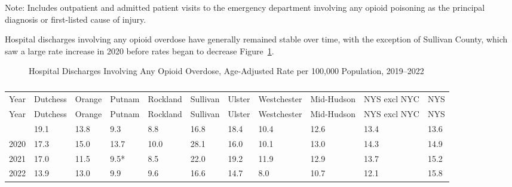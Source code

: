 \documentclass[
  english,
  letterpaper,
]{report}
\begin{document}
\begin{tcolorbox}[enhanced jigsaw, breakable, leftrule=.75mm, title=\textcolor{quarto-callout-note-color}{\faInfo}\hspace{0.5em}{Note}, bottomrule=.15mm, opacityback=0, left=2mm, colback=white, bottomtitle=1mm, coltitle=black, colbacktitle=quarto-callout-note-color!10!white, colframe=quarto-callout-note-color-frame, opacitybacktitle=0.6, toptitle=1mm, titlerule=0mm, arc=.35mm, rightrule=.15mm, toprule=.15mm]

Note: Includes outpatient and admitted patient visits to the emergency
department involving any opioid poisoning as the principal diagnosis or
first-listed cause of injury.

\end{tcolorbox}

Hospital discharges involving any opioid overdose have generally
remained stable over time, with the exception of Sullivan County, which
saw a large rate increase in 2020 before rates began to decrease
Figure~\ref{fig-hospital-dc-opioid-aar}.

\begin{figure}


\caption{\label{fig-hospital-dc-opioid-aar}Hospital Discharges Involving
Any Opioid Overdose, Age-Adjusted Rate per 100,000 Population,
2019--2022}

\end{figure}%

\begin{longtable}[]{@{}lllllllllll@{}}

\caption{\label{tbl-hospital-dc-opioid-aar}Hospital Discharges Involving
Any Opioid Overdose, Age-Adjusted Rate per 100,000 Population,
2019--2022}

\tabularnewline

\caption{}\label{T_36ab1}\tabularnewline
\toprule\noalign{}
Year & Dutchess & Orange & Putnam & Rockland & Sullivan & Ulster &
Westchester & Mid-Hudson & NYS excl NYC & NYS \\
\midrule\noalign{}
\endfirsthead
\toprule\noalign{}
Year & Dutchess & Orange & Putnam & Rockland & Sullivan & Ulster &
Westchester & Mid-Hudson & NYS excl NYC & NYS \\
\midrule\noalign{}
\endhead
\bottomrule\noalign{}
\endlastfoot
2019 & 19.1 & 13.8 & 9.3 & 8.8 & 16.8 & 18.4 & 10.4 & 12.6 & 13.4 &
13.6 \\
2020 & 17.3 & 15.0 & 13.7 & 10.0 & 28.1 & 16.0 & 10.1 & 13.0 & 14.3 &
14.9 \\
2021 & 17.0 & 11.5 & 9.5* & 8.5 & 22.0 & 19.2 & 11.9 & 12.9 & 13.7 &
15.2 \\
2022 & 13.9 & 13.0 & 9.9 & 9.6 & 16.6 & 14.7 & 8.0 & 10.7 & 12.1 &
15.8 \\

\end{longtable}
\end{document}
